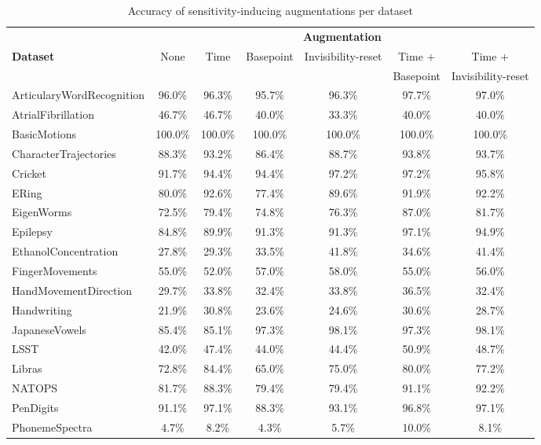 \documentclass{article}
\theoremstyle{definition}
\theoremstyle{remark}
\begin{document}
	\begin{table}[h]
	\small
	\centering
	\caption{Accuracy of sensitivity-inducing augmentations per dataset}
	\label{tab:complete_results_basic_augs}
	\begin{tabular}{lcccccc}
	\toprule
	 & \multicolumn{6}{c}{\textbf{Augmentation}}\\
	 \cmidrule{2-7}
	\multirow{2}{*}{\textbf{Dataset}} &\multirow{2}{*}{None } &\multirow{2}{*}{Time} &\multirow{2}{*}{Basepoint}& \multirow{2}{*}{Invisibility-reset}    & Time + & Time +        \\
		& & & & & Basepoint & Invisibility-reset  \\
	\midrule
	ArticularyWordRecognition & 96.0\% & 96.3\% & 95.7\% & 96.3\% & 97.7\% & 97.0\% \\
	AtrialFibrillation & 46.7\% & 46.7\% & 40.0\% & 33.3\% & 40.0\% & 40.0\% \\
	BasicMotions & 100.0\% & 100.0\% & 100.0\% & 100.0\% & 100.0\% & 100.0\% \\
	CharacterTrajectories & 88.3\% & 93.2\% & 86.4\% & 88.7\% & 93.8\% & 93.7\% \\
	Cricket & 91.7\% & 94.4\% & 94.4\% & 97.2\% & 97.2\% & 95.8\% \\
	ERing & 80.0\% & 92.6\% & 77.4\% & 89.6\% & 91.9\% & 92.2\% \\
	EigenWorms & 72.5\% & 79.4\% & 74.8\% & 76.3\% & 87.0\% & 81.7\% \\
	Epilepsy & 84.8\% & 89.9\% & 91.3\% & 91.3\% & 97.1\% & 94.9\% \\
	EthanolConcentration & 27.8\% & 29.3\% & 33.5\% & 41.8\% & 34.6\% & 41.4\% \\
	FingerMovements & 55.0\% & 52.0\% & 57.0\% & 58.0\% & 55.0\% & 56.0\% \\
	HandMovementDirection & 29.7\% & 33.8\% & 32.4\% & 33.8\% & 36.5\% & 32.4\% \\
	Handwriting & 21.9\% & 30.8\% & 23.6\% & 24.6\% & 30.6\% & 28.7\% \\
	JapaneseVowels & 85.4\% & 85.1\% & 97.3\% & 98.1\% & 97.3\% & 98.1\% \\
	LSST & 42.0\% & 47.4\% & 44.0\% & 44.4\% & 50.9\% & 48.7\% \\
	Libras & 72.8\% & 84.4\% & 65.0\% & 75.0\% & 80.0\% & 77.2\% \\
	NATOPS & 81.7\% & 88.3\% & 79.4\% & 79.4\% & 91.1\% & 92.2\% \\
	PenDigits & 91.1\% & 97.1\% & 88.3\% & 93.1\% & 96.8\% & 97.1\% \\
	PhonemeSpectra & 4.7\% & 8.2\% & 4.3\% & 5.7\% & 10.0\% & 8.1\% \\

\end{tabular}
\end{table}
\end{document}
